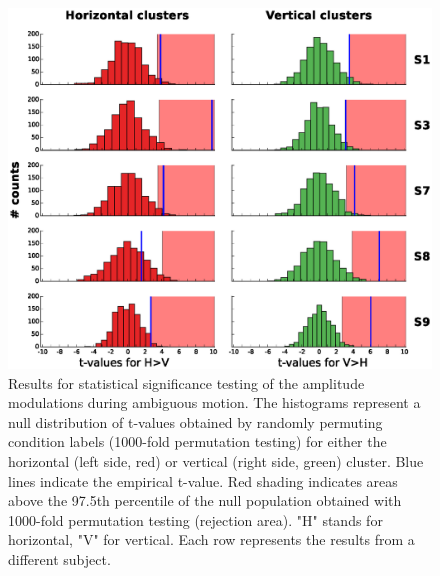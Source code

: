 \begin{figure}[htbp!]
\centering
\includegraphics[width=\textwidth]{figures/chapter_03_SI/figS4.eps}
\caption{Results for statistical significance testing of the amplitude modulations during ambiguous motion. The histograms represent a null distribution of t-values obtained by randomly permuting condition labels (1000-fold permutation testing) for either the horizontal (left side, red) or vertical (right side, green) cluster. Blue lines indicate the empirical t-value. Red shading indicates areas above the 97.5th percentile of the null population obtained with 1000-fold permutation testing (rejection area). "H" stands for horizontal, "V" for vertical. Each row represents the results from a different subject.}
\label{fig:fig2C_supp}
\end{figure}


